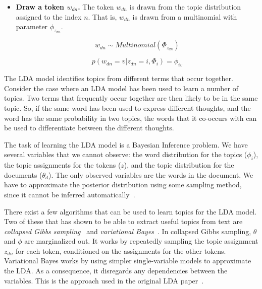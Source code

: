 \begin{itemize}
\begin{itemize}
            \item \textbf{Draw a token $w_{dn}$.}
                The token $w_{dn}$ is drawn from the topic distribution assigned to the index $n$.
                That is, $w_{dn}$ is drawn from a multinomial with parameter $\phi_{z_{dn}}$.

                \begin{equation}
                    w_{dn} \sim Multinomial(\Phi_{z_{dn}})
                \end{equation}

                \begin{equation}
                    p(w_{dn}=v|z_{dn}=i,\Phi_i) = \phi_{iv}
                \end{equation}

        \end{itemize}

\end{itemize}

The LDA model identifies topics from different terms that occur together.
Consider the case where an LDA model has been used to learn a number of topics.
Two terms that frequently occur together are then likely to be in the same topic.
So, if the same word has been used to express different thoughts, and the word has the same probability in two topics, the words that it co-occurs with can be used to differentiate between the different thoughts.

The task of learning the LDA model is a Bayesian Inference problem.
We have several variables that we cannot observe: the word distribution for the topics ($\phi_i$), the topic assignments for the tokens ($z$), and the topic distribution for the documents ($\theta_d$).
The only observed variables are the words in the document.
We have to approximate the posterior distribution using some sampling method, since it cannot be inferred automatically~\cite{blei2003latent}.

There exist a few algorithms that can be used to learn topics for the LDA model. 
Two of these that has shown to be able to extract useful topics from text are \textit{collapsed Gibbs sampling}~\cite{griffiths2004finding} and \textit{variational Bayes}~\cite{blei2003latent}.  
In collapsed Gibbs sampling, $\theta$ and $\phi$ are marginalized out.
It works by repeatedly sampling the topic assignment $z_{dn}$ for each token, conditioned on the assignments for the other tokens.
Variational Bayes works by using simpler single-variable models to approximate the LDA\@. 
As a consequence, it disregards any dependencies between the variables.
This is the approach used in the original LDA paper~\cite{blei2003latent}.

